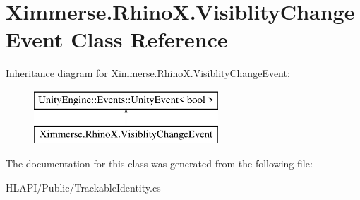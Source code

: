 \hypertarget{class_ximmerse_1_1_rhino_x_1_1_visiblity_change_event}{}\section{Ximmerse.\+Rhino\+X.\+Visiblity\+Change\+Event Class Reference}
\label{class_ximmerse_1_1_rhino_x_1_1_visiblity_change_event}
Inheritance diagram for Ximmerse.\+Rhino\+X.\+Visiblity\+Change\+Event\+:\begin{figure}[H]
\begin{center}
\leavevmode
\includegraphics[height=2.000000cm]{class_ximmerse_1_1_rhino_x_1_1_visiblity_change_event}
\end{center}
\end{figure}


The documentation for this class was generated from the following file\+:\begin{DoxyCompactItemize}
\item 
H\+L\+A\+P\+I/\+Public/Trackable\+Identity.\+cs\end{DoxyCompactItemize}
